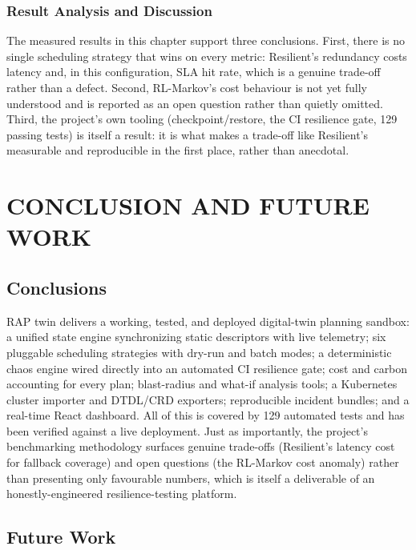 \documentclass[12pt,a4]{report}
\begin{document}
 \subsection{Result Analysis and Discussion}

The measured results in this chapter support three conclusions. First, there is no single scheduling strategy that wins on every metric: Resilient's redundancy costs latency and, in this configuration, SLA hit rate, which is a genuine trade-off rather than a defect. Second, RL-Markov's cost behaviour is not yet fully understood and is reported as an open question rather than quietly omitted. Third, the project's own tooling (checkpoint/restore, the CI resilience gate, 129 passing tests) is itself a result: it is what makes a trade-off like Resilient's measurable and reproducible in the first place, rather than anecdotal.

 \chapter{CONCLUSION AND \vspace*{0.5\baselineskip} FUTURE WORK}

 \section{Conclusions}

RAP twin delivers a working, tested, and deployed digital-twin planning sandbox: a unified state engine synchronizing static descriptors with live telemetry; six pluggable scheduling strategies with dry-run and batch modes; a deterministic chaos engine wired directly into an automated CI resilience gate; cost and carbon accounting for every plan; blast-radius and what-if analysis tools; a Kubernetes cluster importer and DTDL/CRD exporters; reproducible incident bundles; and a real-time React dashboard. All of this is covered by 129 automated tests and has been verified against a live deployment. Just as importantly, the project's benchmarking methodology surfaces genuine trade-offs (Resilient's latency cost for fallback coverage) and open questions (the RL-Markov cost anomaly) rather than presenting only favourable numbers, which is itself a deliverable of an honestly-engineered resilience-testing platform.

 \section{Future Work}
 \label{sec:future-work}
\end{document}
